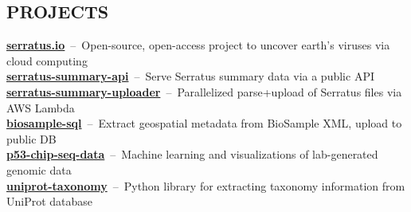 \documentclass[line,resmargin]{res}
\begin{document}
\begin{resume}
\section{PROJECTS}
    \textbf{\href{https://serratus.io/}{serratus.io}}~--~Open-source, open-access project to uncover earth's viruses via cloud computing \\
    \textbf{\href{https://github.com/serratus-bio/serratus-summary-api}{serratus-summary-api}}~--~Serve Serratus summary data via a public API \\
    \textbf{\href{https://github.com/serratus-bio/serratus-summary-uploader}{serratus-summary-uploader}}~--~Parallelized parse+upload of Serratus files via AWS Lambda \\
    \textbf{\href{https://github.com/serratus-bio/biosample-sql}{biosample-sql}}~--~Extract geospatial metadata from BioSample XML, upload to public DB \\
    \textbf{\href{https://github.com/zhoulab/p53-chip-seq-data}{p53-chip-seq-data}}~--~Machine learning and visualizations of lab-generated genomic data \\
    \textbf{\href{https://github.com/zhoulab/uniprot-taxonomy}{uniprot-taxonomy}}~--~Python library for extracting taxonomy information from UniProt database \\




\end{resume}
\end{document}
